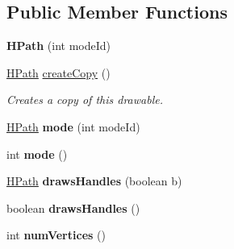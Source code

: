 \subsection*{Public Member Functions}
\begin{DoxyCompactItemize}
\item 
\hypertarget{classhype_1_1extended_1_1drawable_1_1_h_path_afd5ddb1b8ab193b0bd8e9164173cca90}{{\bfseries H\-Path} (int mode\-Id)}\label{classhype_1_1extended_1_1drawable_1_1_h_path_afd5ddb1b8ab193b0bd8e9164173cca90}

\item 
\hyperlink{classhype_1_1extended_1_1drawable_1_1_h_path}{H\-Path} \hyperlink{classhype_1_1extended_1_1drawable_1_1_h_path_a4e52a72a0178da91cc6c1d85eeeea7ad}{create\-Copy} ()
\begin{DoxyCompactList}\small\item\em Creates a copy of this drawable. \end{DoxyCompactList}\item 
\hypertarget{classhype_1_1extended_1_1drawable_1_1_h_path_a36018c98f21de62190b9cf543aa393c6}{\hyperlink{classhype_1_1extended_1_1drawable_1_1_h_path}{H\-Path} {\bfseries mode} (int mode\-Id)}\label{classhype_1_1extended_1_1drawable_1_1_h_path_a36018c98f21de62190b9cf543aa393c6}

\item 
\hypertarget{classhype_1_1extended_1_1drawable_1_1_h_path_ab844c462c5c284abce61b5b429bf9cfa}{int {\bfseries mode} ()}\label{classhype_1_1extended_1_1drawable_1_1_h_path_ab844c462c5c284abce61b5b429bf9cfa}

\item 
\hypertarget{classhype_1_1extended_1_1drawable_1_1_h_path_a41cdef72f86f092c50ac325ba0155932}{\hyperlink{classhype_1_1extended_1_1drawable_1_1_h_path}{H\-Path} {\bfseries draws\-Handles} (boolean b)}\label{classhype_1_1extended_1_1drawable_1_1_h_path_a41cdef72f86f092c50ac325ba0155932}

\item 
\hypertarget{classhype_1_1extended_1_1drawable_1_1_h_path_ac881c0a37ae9fe5405353ff27ceaa649}{boolean {\bfseries draws\-Handles} ()}\label{classhype_1_1extended_1_1drawable_1_1_h_path_ac881c0a37ae9fe5405353ff27ceaa649}

\item 
\hypertarget{classhype_1_1extended_1_1drawable_1_1_h_path_a07cdbdb1dcf47819876b22a01e71bc76}{int {\bfseries num\-Vertices} ()}\label{classhype_1_1extended_1_1drawable_1_1_h_path_a07cdbdb1dcf47819876b22a01e71bc76}


\end{DoxyCompactItemize}
